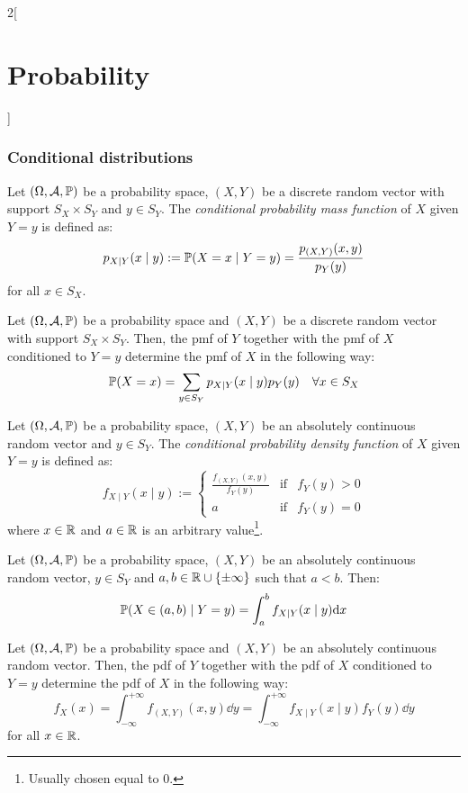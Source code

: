 \documentclass[../../../main.tex]{subfiles}
\begin{document}
\begin{multicols}{2}[\section{Probability}]
  \subsubsection{Conditional distributions}
  \begin{definition}
    Let $(\Omega,\mathcal{A},\mathbb{P})$ be a probability space, $(X,Y)$ be a discrete random vector with support $S_X\times S_Y$ and $y\in S_Y$. The \textit{conditional probability mass function} of $X$ given $Y=y$ is defined as: $$p_{X\mid Y}(x\mid y):=\mathbb{P}(X=x\mid Y=y)=\frac{p_{(X,Y)}(x,y)}{p_Y(y)}$$ for all $x\in S_X$.
  \end{definition}
  \begin{prop}
    Let $(\Omega,\mathcal{A},\mathbb{P})$ be a probability space and $(X,Y)$ be a discrete random vector with support $S_X\times S_Y$. Then, the pmf of $Y$ together with the pmf of $X$ conditioned to $Y=y$ determine the pmf of $X$ in the following way: $$\mathbb{P}(X=x)=\sum_{y\in S_Y}p_{X\mid Y}(x\mid y)p_Y(y)\quad\forall x\in S_X$$
  \end{prop}
  \begin{definition}
    Let $(\Omega,\mathcal{A},\mathbb{P})$ be a probability space, $(X,Y)$ be an absolutely continuous random vector and $y\in S_Y$. The \textit{conditional probability density function} of $X$ given $Y=y$ is defined as: $$f_{X\mid Y}(x\mid y):=\left\{
      \begin{array}{ccc}
        \frac{f_{(X,Y)}(x,y)}{f_Y(y)} & \text{if} & f_Y(y)>0 \\
        a                             & \text{if} & f_Y(y)=0
      \end{array}\right.
    $$ where $x\in\mathbb{R}$ and $a\in\mathbb{R}$ is an arbitrary value\footnote{Usually chosen equal to 0.}.
  \end{definition}
  \begin{prop}
    Let $(\Omega,\mathcal{A},\mathbb{P})$ be a probability space, $(X,Y)$ be an absolutely continuous random vector, $y\in S_Y$ and $a,b\in\mathbb{R}\cup\{\pm\infty\}$ such that $a<b$. Then: $$\mathbb{P}(X\in(a,b)\mid Y=y)=\int_a^bf_{X\mid Y}(x\mid y)\dd x$$
  \end{prop}
  \begin{prop}
    Let $(\Omega,\mathcal{A},\mathbb{P})$ be a probability space and $(X,Y)$ be an absolutely continuous random vector. Then, the pdf of $Y$ together with the pdf of $X$ conditioned to $Y=y$ determine the pdf of $X$ in the following way: $$f_X(x)=\int_{-\infty}^{+\infty}f_{(X,Y)}(x,y)\dd y=\int_{-\infty}^{+\infty}f_{X\mid Y}(x\mid y)f_Y(y)\dd y$$ for all $x\in\mathbb{R}$.
  \end{prop}

\end{multicols}
\end{document}
